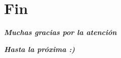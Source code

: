\documentclass[11pt,a4paper, compress,graphics]{beamer}
\begin{document}







\section*{Fin}

\begin{frame}
\begin{center}
    \vspace{1cm}
    {\Large \textbf{\textit{Muchas gracias por la atención}}}
\end{center}  

    \begin{center}
        \vspace{2cm}
        {\Large \textbf{\textit{Hasta la próxima :)}}}
    \end{center}
\end{frame}
\end{document}
